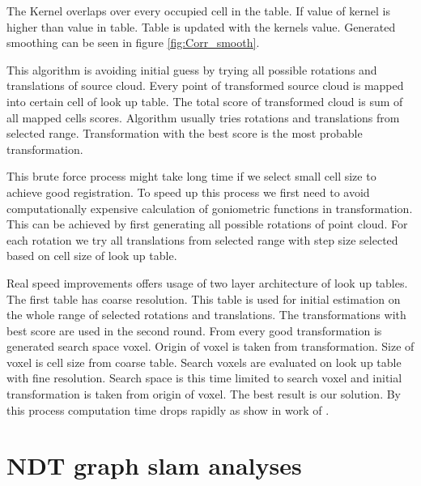  The Kernel overlaps over every occupied cell in the table. If value of kernel is higher than value in table. Table is updated with the kernels value. Generated smoothing can be seen in figure \ref{fig:Corr_smooth}.
 
 This algorithm is avoiding initial guess by trying all possible rotations and translations of source cloud. Every point of transformed source cloud is mapped into certain cell of look up table. The total score of transformed cloud is sum of all mapped cells scores. Algorithm usually tries rotations and translations from selected range. Transformation with the best score is the most probable transformation.
 
 This brute force process might take long time if we select small cell size to achieve good registration. To speed up this process we first need to avoid computationally expensive calculation of goniometric functions in transformation. This can be achieved by first generating all possible rotations of point cloud. For each rotation we try all translations from selected range with step size selected based on cell size of look up table.
 
 Real speed improvements offers usage of two layer architecture of look up tables. The first table has coarse resolution. This table is used for initial estimation on the whole range of selected rotations and translations. The transformations with best score are used in the second round. From every good transformation is generated search space voxel. Origin of voxel is taken from transformation. Size of voxel is cell size from coarse table. Search voxels are evaluated on look up table with fine resolution. Search space is this time limited to search voxel and initial transformation is taken from origin of voxel. The best result is our solution. By this process computation time drops rapidly as show in work of \cite{olson2009real}.     
    
\newpage
\section{NDT graph slam analyses}
\label{subsec:analyses}


